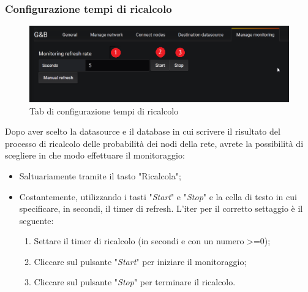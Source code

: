 \subsubsection{Configurazione tempi di ricalcolo}
\begin{figure} [H]
	\centering
	\includegraphics[scale=0.55]{Img/monitoring} 
	\caption{Tab di configurazione tempi di ricalcolo} \label{} 
\end{figure} 
Dopo aver scelto la datasource e il database in cui scrivere il risultato del processo di ricalcolo delle probabilità dei nodi della rete, avrete la possibilità di scegliere in che modo effettuare il monitoraggio:
\begin{itemize}
	\item Saltuariamente tramite il tasto "Ricalcola";
	\item Costantemente, utilizzando i tasti "\emph{Start}" e "\emph{Stop}" e la cella di testo in cui specificare, in secondi, il timer di refresh. L'iter per il corretto settaggio è il seguente:
		\begin{enumerate}
				\item Settare il timer di ricalcolo (in secondi e con un numero >=0);
				\item Cliccare sul pulsante "\emph{Start}" per iniziare il monitoraggio;
				\item Cliccare sul pulsante "\emph{Stop}" per terminare il ricalcolo.
		\end{enumerate}
\end{itemize}